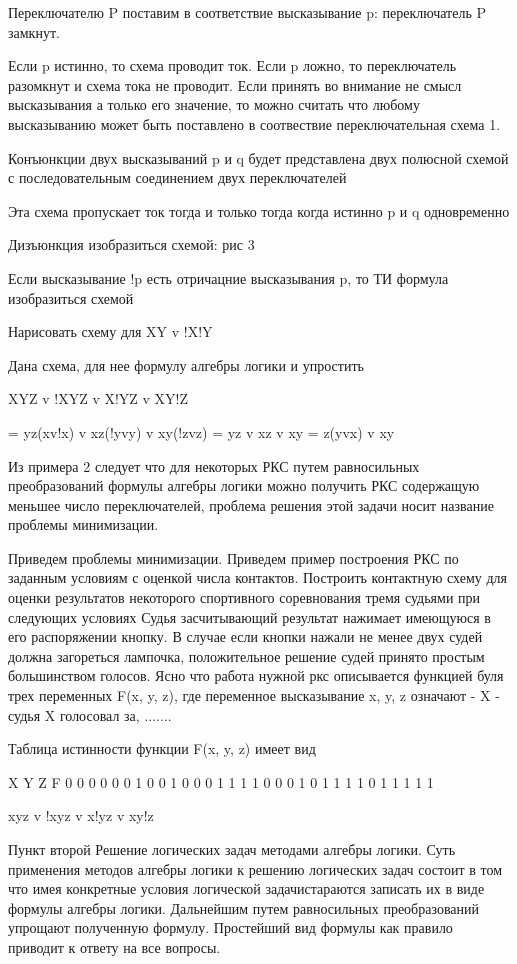 Переключателю P поставим в соответствие высказывание p:
переключатель P замкнут.

Если p истинно, то схема проводит ток. Если p ложно, то переключатель разомкнут и схема тока не проводит.
Если принять во внимание не смысл высказывания а только его значение, то можно считать что любому высказыванию может быть поставлено в соотвествие переключательная схема 1.

Конъюнкции двух высказываний p и q будет представлена двух полюсной схемой с последовательным соединением двух переключателей

Эта схема пропускает ток тогда и только тогда когда истинно p и q одновременно

Дизъюнкция изобразиться схемой: рис 3

Если высказывание !p есть отричацние высказывания p, то ТИ формула изобразиться схемой

Нарисовать схему для
XY v !X!Y

Дана схема, для нее формулу алгебры логики и упростить

XYZ v !XYZ v X!YZ v XY!Z

= yz(xv!x) v xz(!yvy) v xy(!zvz)
= yz v xz v xy = z(yvx) v xy

Из примера 2 следует что для некоторых РКС путем равносильных преобразований формулы алгебры логики можно получить РКС содержащую меньшее число переключателей, проблема решения этой задачи носит название проблемы минимизации.

Приведем проблемы минимизации.
Приведем пример построения РКС по заданным условиям с оценкой числа контактов.
Построить контактную схему для оценки результатов некоторого спортивного соревнования тремя судьями при следующих условиях
Судья засчитывающий результат нажимает имеющуюся в его распоряжении кнопку.
В случае если кнопки нажали не менее двух судей должна загореться лампочка, положительное решение судей принято простым большинством голосов. Ясно что работа нужной ркс описывается функцией буля трех переменных F(x, y, z), где переменное высказывание x, y, z означают - X - судья X голосовал за, .......


Таблица истинности функции F(x, y, z) имеет вид

X Y Z F
0 0 0 0
0 0 1 0
0 1 0 0
0 1 1 1
1 0 0 0
1 0 1 1
1 1 0 1
1 1 1 1

xyz v !xyz v x!yz v xy!z

Пункт второй
Решение логических задач методами алгебры логики.
Суть применения методов алгебры логики к решению логических задач состоит в том что имея конкретные условия логической задачистараются записать их в виде формулы алгебры логики. Дальнейшим путем равносильных преобразований упрощают полученную формулу. Простейший вид формулы как правило приводит к ответу на все вопросы.

